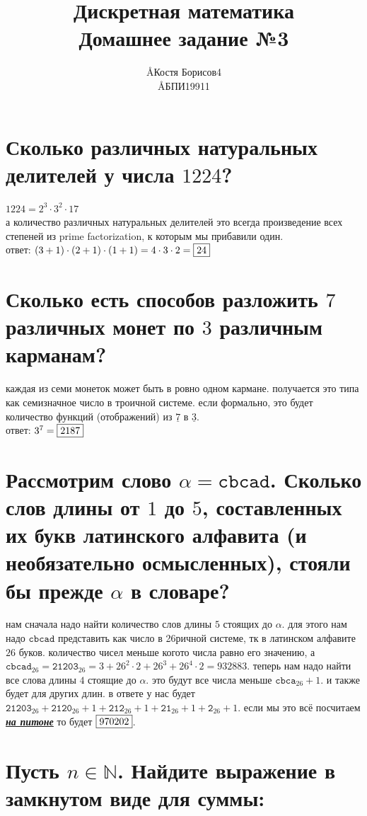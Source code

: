 \documentclass{article}
\title{Дискретная математика \\ Домашнее задание №3}
\author{\AA{Костя Борисов}{4} \\ \AA{БПИ199}{11}}
\newcommand{\N}{\mathbb{N}}
\newcommand{\range}{\underline}
\begin{document}
  \maketitle

  \section{Сколько различных натуральных делителей у числа $1224$?}
  $1224 = 2^3 \cdot 3^2 \cdot 17$ \\
  а количество различных натуральных делителей это всегда\cite{divisor} произведение всех степеней из prime factorization,
  к которым мы прибавили один. \\
  ответ: $(3+1)\cdot(2+1)\cdot(1+1) = 4\cdot3\cdot2 = \fbox{24}$

  \section{Сколько есть способов разложить $7$ различных монет по $3$ различным карманам?}
  каждая из семи монеток может быть в ровно одном кармане. получается это типа как семизначное число в троичной системе.
  если формально, это будет количество функций (отображений) из $\range{7}$ в $\range{3}$. \\
  ответ: $3^7 = \fbox{2187}$

  \section{Рассмотрим слово $\alpha = \texttt{cbcad}$. Сколько слов длины от $1$ до $5$, составленных их букв латинского алфавита (и необязательно осмысленных), стояли бы прежде $\alpha$ в словаре?}
  нам сначала надо найти количество слов длины $5$ стоящих до $\alpha$.
  для этого нам надо $\texttt{cbcad}$ представить как число в 26ричной системе, тк в латинском алфавите $26$ буков.
  количество чисел меньше когото числа равно его значению,
  а $\texttt{cbcad}_{26} = \texttt{21203}_{26} = 3+26^2\cdot2+26^3+26^4\cdot2 = 932883$.
  теперь нам надо найти все слова длины $4$ стоящие до $\alpha$. это будут все числа меньше $\texttt{cbca}_{26}+1$.
  и также будет для других длин.
  в ответе у нас будет $ \texttt{21203}_{26} + \texttt{2120}_{26}+1 + \texttt{212}_{26}+1 + \texttt{21}_{26}+1 + \texttt{2}_{26}+1$.
  если мы это всё посчитаем \underline{\textit{\textbf{\Large на питоне}}} то будет $\fbox{970202}$.

  \section{Пусть $n \in \N$. Найдите выражение в замкнутом виде для суммы:}
\end{document}
